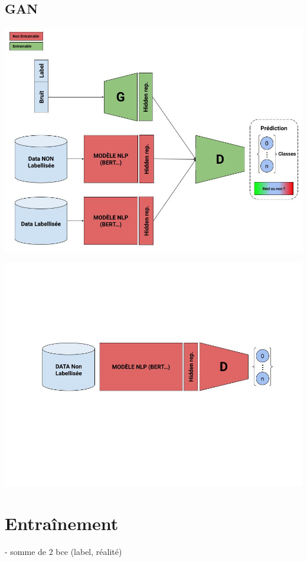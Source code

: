 \documentclass[francais,runningheads,a4paper]{llncs}
\begin{document}
	\subsection{GAN}

	\includegraphics[width=\textwidth]{Architectutre_Entrainement.jpg}

	\includegraphics[width=\textwidth]{Architecture_Utilisation.jpg}
	
\section{Entraînement}

	- somme de 2 bce (label, réalité)
\end{document}
